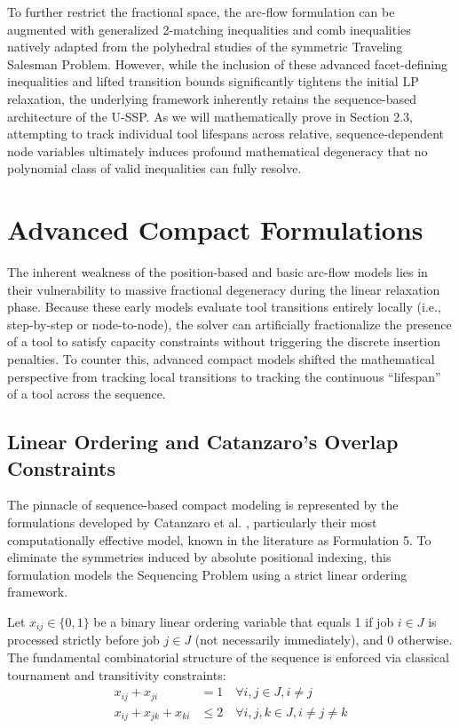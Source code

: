 \documentclass[11pt, a4paper]{book}
\begin{document}
	To further restrict the fractional space, the arc-flow formulation can be augmented with generalized 2-matching inequalities and comb inequalities natively adapted from the polyhedral studies of the symmetric Traveling Salesman Problem. However, while the inclusion of these advanced facet-defining inequalities and lifted transition bounds significantly tightens the initial LP relaxation, the underlying framework inherently retains the sequence-based architecture of the U-SSP. As we will mathematically prove in Section 2.3, attempting to track individual tool lifespans across relative, sequence-dependent node variables ultimately induces profound mathematical degeneracy that no polynomial class of valid inequalities can fully resolve.
	
	\section{Advanced Compact Formulations}
	
	The inherent weakness of the position-based and basic arc-flow models lies in their vulnerability to massive fractional degeneracy during the linear relaxation phase. Because these early models evaluate tool transitions entirely locally (i.e., step-by-step or node-to-node), the solver can artificially fractionalize the presence of a tool to satisfy capacity constraints without triggering the discrete insertion penalties. To counter this, advanced compact models shifted the mathematical perspective from tracking local transitions to tracking the continuous ``lifespan'' of a tool across the sequence.
	
	\subsection{Linear Ordering and Catanzaro's Overlap Constraints}
	
	The pinnacle of sequence-based compact modeling is represented by the formulations developed by Catanzaro et al. \cite{Catanzaro2015}, particularly their most computationally effective model, known in the literature as Formulation 5. To eliminate the symmetries induced by absolute positional indexing, this formulation models the Sequencing Problem using a strict linear ordering framework.
	
	Let $x_{ij} \in \{0,1\}$ be a binary linear ordering variable that equals 1 if job $i \in J$ is processed strictly before job $j \in J$ (not necessarily immediately), and 0 otherwise. The fundamental combinatorial structure of the sequence is enforced via classical tournament and transitivity constraints:
	\begin{align}
		x_{ij} + x_{ji} & = 1 \quad \forall i, j \in J, i \neq j \label{eq:cat_tourn} \\
		x_{ij} + x_{jk} + x_{ki} & \le 2 \quad \forall i, j, k \in J, i \neq j \neq k \label{eq:cat_trans}
	\end{align}
	
\end{document}
